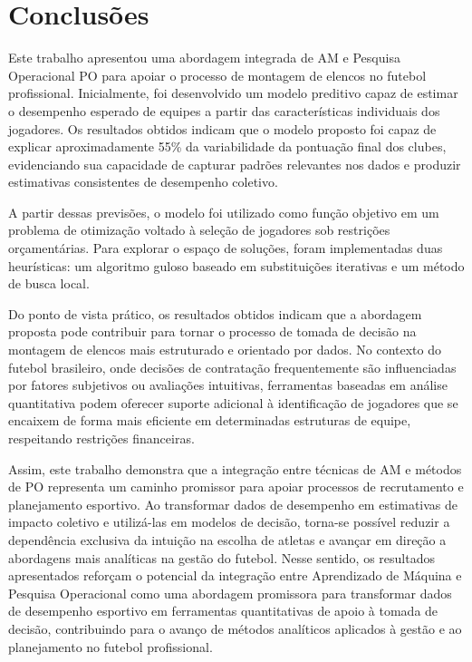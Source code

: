 \chapter{Conclusões}

Este trabalho apresentou uma abordagem integrada de AM e Pesquisa Operacional PO para apoiar o processo de montagem de elencos no futebol profissional. 
Inicialmente, foi desenvolvido um modelo preditivo capaz de estimar o desempenho esperado de equipes a partir das características individuais dos jogadores. 
Os resultados obtidos indicam que o modelo proposto foi capaz de explicar aproximadamente 55\% da variabilidade da pontuação final dos clubes, evidenciando 
sua capacidade de capturar padrões relevantes nos dados e produzir estimativas consistentes de desempenho coletivo.

A partir dessas previsões, o modelo foi utilizado como função objetivo em um problema de otimização voltado à seleção de jogadores sob restrições orçamentárias. 
Para explorar o espaço de soluções, foram implementadas duas heurísticas: um algoritmo guloso baseado em substituições iterativas e um método de busca local.

Do ponto de vista prático, os resultados obtidos indicam que a abordagem proposta pode contribuir para tornar o processo de tomada de decisão na montagem de 
elencos mais estruturado e orientado por dados. No contexto do futebol brasileiro, onde decisões de contratação frequentemente são influenciadas por fatores 
subjetivos ou avaliações intuitivas, ferramentas baseadas em análise quantitativa podem oferecer suporte adicional à identificação de jogadores que se encaixem 
de forma mais eficiente em determinadas estruturas de equipe, respeitando restrições financeiras.

Assim, este trabalho demonstra que a integração entre técnicas de AM e métodos de PO representa um caminho promissor para apoiar processos de recrutamento e 
planejamento esportivo. Ao transformar dados de desempenho em estimativas de impacto coletivo e utilizá-las em modelos de decisão, torna-se possível reduzir 
a dependência exclusiva da intuição na escolha de atletas e avançar em direção a abordagens mais analíticas na gestão do futebol. Nesse sentido, 
os resultados apresentados reforçam o potencial da integração entre Aprendizado de Máquina e Pesquisa Operacional como uma abordagem promissora para 
transformar dados de desempenho esportivo em ferramentas quantitativas de apoio à tomada de decisão, contribuindo para o avanço de métodos analíticos 
aplicados à gestão e ao planejamento no futebol profissional.

